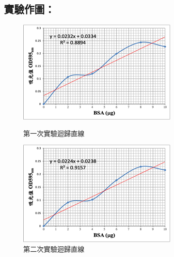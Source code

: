 \subsection*{實驗作圖：}
  
\begin{figure}[H]
\centering
\begin{minipage}[b]{0.45\textwidth} %
\centering
\includegraphics[width=.9\textwidth]{paste_src/2023-09-28-04-14-53.png}
\caption{第一次實驗迴歸直線}
\label{fig:1}
\end{minipage}
\begin{minipage}[b]{0.45\textwidth} %
\centering
\includegraphics[width=.9\textwidth]{paste_src/2023-09-28-04-14-34.png}
\caption{第二次實驗迴歸直線}
\label{fig:2}
\end{minipage}
\end{figure}


